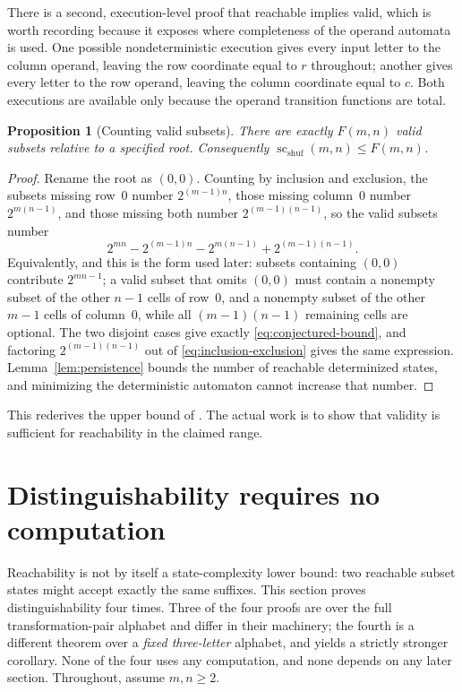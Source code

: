 \documentclass[11pt,letterpaper]{article}
\numberwithin{equation}{section}
\newtheorem{proposition}[theorem]{Proposition}
\theoremstyle{definition}
\theoremstyle{remark}
\newcommand{\scf}{\operatorname{sc}_{\mathrm{shuf}}}
\begin{document}
There is a second, execution-level proof that reachable implies valid, which
is worth recording because it exposes where completeness of the operand
automata is used. One possible nondeterministic execution gives every input
letter to the column operand, leaving the row coordinate equal to $r$
throughout; another gives every letter to the row operand, leaving the column
coordinate equal to $c$. Both executions are available only because the
operand transition functions are total.

\begin{proposition}[Counting valid subsets]\label{prop:upper}
There are exactly $F(m,n)$ valid subsets relative to a specified root.
Consequently $\scf(m,n)\le F(m,n)$.
\end{proposition}
\begin{proof}
Rename the root as $(0,0)$. Counting by inclusion and exclusion, the subsets
missing row~$0$ number $2^{(m-1)n}$, those missing column~$0$ number
$2^{m(n-1)}$, and those missing both number $2^{(m-1)(n-1)}$, so the valid
subsets number
\begin{equation}\label{eq:inclusion-exclusion}
 2^{mn}-2^{(m-1)n}-2^{m(n-1)}+2^{(m-1)(n-1)}.
\end{equation}
Equivalently, and this is the form used later: subsets containing $(0,0)$
contribute $2^{mn-1}$; a valid subset that omits $(0,0)$ must contain a
nonempty subset of the other $n-1$ cells of row~$0$, and a nonempty subset of
the other $m-1$ cells of column~$0$, while all $(m-1)(n-1)$ remaining cells
are optional. The two disjoint cases give exactly
\eqref{eq:conjectured-bound}, and factoring $2^{(m-1)(n-1)}$ out of
\eqref{eq:inclusion-exclusion} gives the same expression.
Lemma~\ref{lem:persistence} bounds the number of reachable determinized
states, and minimizing the deterministic automaton cannot increase that
number.
\end{proof}

This rederives the upper bound of \cite{BJLRS2016}. The actual work is to
show that validity is sufficient for reachability in the claimed range.

\section{Distinguishability requires no computation}
\label{sec:distinguishability}
Reachability is not by itself a state-complexity lower bound: two reachable
subset states might accept exactly the same suffixes. This section proves
distinguishability four times. Three of the four proofs are over the full
transformation-pair alphabet and differ in their machinery; the fourth is a
different theorem over a \emph{fixed three-letter} alphabet, and yields a
strictly stronger corollary. None of the four uses any computation, and none
depends on any later section. Throughout, assume $m,n\ge2$.
\end{document}
